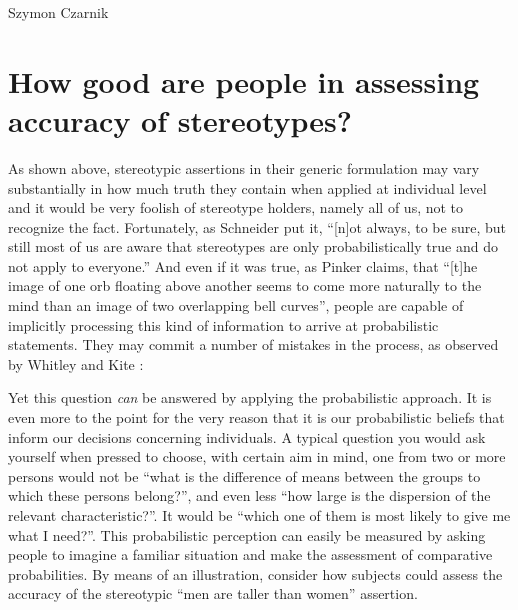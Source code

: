 \begin{artengenv}{Szymon Czarnik}
\section{How good are people in assessing accuracy of stereotypes?}
As shown above, stereotypic assertions in their generic formulation may vary substantially in how much truth they contain when applied at individual level and it would be very foolish of stereotype holders, namely all of us, not to recognize the fact. Fortunately, as Schneider
\parencite*[][p.199]{schneider_psychology_2005} %
 put it, ``[n]ot always, to be sure, but still most of us are aware that stereotypes are only probabilistically true and do not apply to everyone.'' And even if it was true, as Pinker 
\parencite*[][p.86]{pinker_stuff_2007} %
 claims, that ``[t]he image of one orb floating above another seems to come more naturally to the mind than an image of two overlapping bell curves'', people are capable of implicitly processing this kind of information to arrive at probabilistic statements. They may commit a number of mistakes in the process, as observed by Whitley and Kite 
\parencite*[][p.100]{whitley_psychology_2010}:%



Yet this question \textit{can} be answered by applying the probabilistic approach. It is even more to the point for the very reason that it is our probabilistic beliefs that inform our decisions concerning individuals. A typical question you would ask yourself when pressed to choose, with certain aim in mind, one from two or more persons would not be ``what is the difference of means between the groups to which these persons belong?'', and even less ``how large is the dispersion of the relevant characteristic?''. It would be ``which one of them is most likely to give me what I need?''. This probabilistic perception can easily be measured by asking people to imagine a familiar situation and make the assessment of comparative probabilities. By means of an illustration, consider how subjects could assess the accuracy of the stereotypic ``men are taller than women'' assertion.


\end{artengenv}
